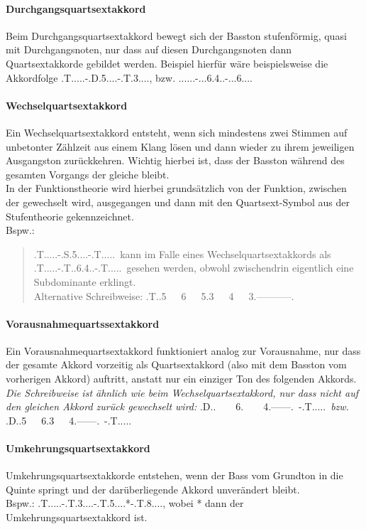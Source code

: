 \documentclass[a4paper]{article}
\newcommand{\dS}[1]{\HH.\uppercase\expandafter{\romannumeral #1\relax}.....} %
\newcommand{\dSS}[1]{\HH.\uppercase\expandafter{\romannumeral #1\relax}..6...} %
\newcommand{\dSQS}[1]{\HH.\uppercase\expandafter{\romannumeral #1\relax}..6.4..} %
\newcommand{\T}{\HH.T.....}
\newcommand{\TS}{\HH.T.3....}
\newcommand{\TQS}{\HH.T.5....}
\newcommand{\SQS}{\HH.S.5....}
\newcommand{\DQS}{\HH.D.5....}
\begin{document}
	\paragraph{Durchgangsquartsextakkord}
	Beim Durchgangsquartsextakkord bewegt sich der Basston stufenförmig, quasi mit Durchgangsnoten, nur dass auf diesen Durchgangsnoten dann Quartsextakkorde gebildet werden. Beispiel hierfür wäre beispielsweise die Akkordfolge \T-\DQS-\TS, bzw. \dS{1}-\dSQS{5}-\dSS{1}.
	
	\paragraph{Wechselquartsextakkord}
	Ein Wechselquartsextakkord entsteht, wenn sich mindestens zwei Stimmen auf unbetonter Zählzeit aus einem Klang lösen und dann wieder zu ihrem jeweiligen Ausgangston zurückkehren. Wichtig hierbei ist, dass der Basston während des gesamten Vorgangs der gleiche bleibt.\\
	In der Funktionstheorie wird hierbei grundsätzlich von der Funktion, zwischen der gewechselt wird, ausgegangen und dann mit den Quartsext-Symbol aus der Stufentheorie gekennzeichnet.\\ Bspw.:
	\begin{quote}
		\T-\SQS-\T\ kann im Falle eines Wechselquartsextakkords als \T-\HH.T..6.4..-\T\ gesehen werden, obwohl zwischendrin eigentlich eine Subdominante erklingt.\\
		Alternative Schreibweise: \HH.T..5\ \ \ 6\ \ \ 5.3\ \ \ 4\ \ \ 3.-----------.
	\end{quote}

	\paragraph{Vorausnahmequartssextakkord}
	Ein Vorausnahmequartsextakkord funktioniert analog zur Vorausnahme, nur dass der gesamte Akkord vorzeitig als Quartsextakkord (also mit dem Basston vom vorherigen Akkord) auftritt, anstatt nur ein einziger Ton des folgenden Akkords.\\
	\textit{Die Schreibweise ist ähnlich wie beim Wechselquartsextakkord, nur dass nicht auf den gleichen Akkord zurück gewechselt wird:} 
	\HH.D..\ \ \ \ 6.\ \ \ \ 4.------.\ -\T\ \textit{bzw.} \HH.D..5\ \ \ 6.3\ \ \ 4.------.\ -\T
	
	\paragraph{Umkehrungsquartsextakkord}
	Umkehrungsquartsextakkorde entstehen, wenn der Bass vom Grundton in die Quinte springt und der darüberliegende Akkord unverändert bleibt.\\
	Bspw.: \T-\TS-\TQS*-\HH.T.8...., wobei * dann der Umkehrungsquartsextakkord ist.
	
\end{document}
